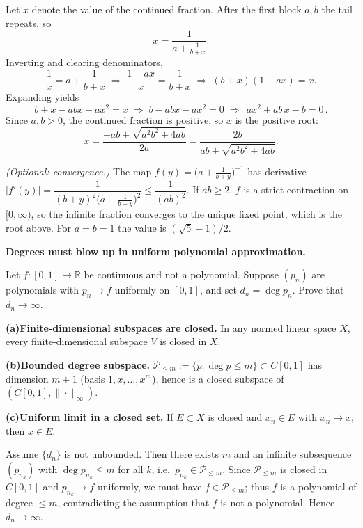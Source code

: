 \begin{solution}
Let $x$ denote the value of the continued fraction. After the first block $a,b$ the tail repeats, so
	\[
	x=\frac{1}{a+\frac{1}{b+x}}.
	\]
	Inverting and clearing denominators,
	\[
	\frac{1}{x}=a+\frac{1}{b+x}
	\;\Longrightarrow\;
	\frac{1-ax}{x}=\frac{1}{b+x}
	\;\Longrightarrow\;
	(b+x)(1-ax)=x.
	\]
	Expanding yields
	\[
	b+x-abx-a x^2=x
	\;\Longrightarrow\;
	b-abx-a x^2=0
	\;\Longrightarrow\;
	\boxed{\,a x^2+ab\,x-b=0\,}.
	\]
	Since $a,b>0$, the continued fraction is positive, so $x$ is the positive root:
	\[
	x=\frac{-ab+\sqrt{a^2b^2+4ab}}{2a}
	=\frac{2b}{ab+\sqrt{a^2b^2+4ab}}.
	\]

	\emph{(Optional: convergence.)}
	The map $f(y)=\bigl(a+\frac{1}{b+y}\bigr)^{-1}$ has derivative
	\(
	|f'(y)|=\dfrac{1}{(b+y)^2\bigl(a+\frac{1}{b+y}\bigr)^2}\le \dfrac{1}{(ab)^2}.
	\)
	If $ab\ge2$, $f$ is a strict contraction on $[0,\infty)$, so the infinite fraction converges to the unique fixed point, which is the root above. For $a=b=1$ the value is $(\sqrt5-1)/2$.
\end{solution}

\begin{problem}[CP-II-0466]
\label{prob:cp-ii-0466}
\textbf{Degrees must blow up in uniform polynomial approximation.}

\hspace*{1.5em}Let $f:[0,1]\to\mathbb{R}$ be continuous and not a polynomial. Suppose $(p_n)$ are polynomials
with $p_n\to f$ uniformly on $[0,1]$, and set $d_n=\deg p_n$. Prove that $d_n\to\infty$.

\bigskip

 \setlength{\itemsep}{0.6em}
	\par\smallskip\noindent\textbf{(a)}\quad \textbf{Finite-dimensional subspaces are closed.}
	In any normed linear space $X$, every finite-dimensional subspace $V$ is closed in $X$.
	\par\smallskip\noindent\textbf{(b)}\quad \textbf{Bounded degree subspace.}
	$\mathcal P_{\le m}:=\{p:\deg p\le m\}\subset C[0,1]$ has dimension $m+1$
	(basis $1,x,\dots,x^m$), hence is a closed subspace of $(C[0,1],\|\cdot\|_\infty)$.
	\par\smallskip\noindent\textbf{(c)}\quad \textbf{Uniform limit in a closed set.}
	If $E\subset X$ is closed and $x_n\in E$ with $x_n\to x$, then $x\in E$.

\bigskip
\end{problem}

\begin{solution}
Assume $\{d_n\}$ is not unbounded. Then there exists $m$ and an infinite subsequence $(p_{n_k})$
with $\deg p_{n_k}\le m$ for all $k$, i.e.\ $p_{n_k}\in \mathcal P_{\le m}$.
Since $\mathcal P_{\le m}$ is closed in $C[0,1]$ and $p_{n_k}\to f$ uniformly, we must have
$f\in \mathcal P_{\le m}$; thus $f$ is a polynomial of degree $\le m$, contradicting the
assumption that $f$ is not a polynomial. Hence $d_n\to\infty$.

\bigskip
\end{solution}

